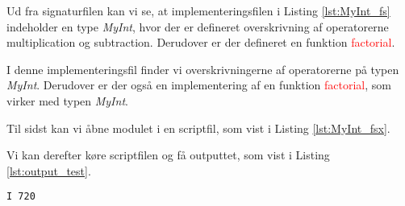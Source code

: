Ud fra signaturfilen kan vi se, at implementeringsfilen i Listing \ref{lst:MyInt_fs} indeholder en type \textit{MyInt}, hvor der er defineret overskrivning af operatorerne multiplication og subtraction. Derudover er der defineret en funktion \textcolor{red}{factorial}. 



I denne implementeringsfil finder vi overskrivningerne af operatorerne på typen \textit{MyInt}. Derudover er der også en implementering af en funktion \textcolor{red}{factorial}, som virker med typen \textit{MyInt}. 

Til sidst kan vi åbne modulet i en scriptfil, som vist i Listing \ref{lst:MyInt_fsx}.



Vi kan derefter køre scriptfilen og få outputtet, som vist i Listing \ref{lst:output_test}.

\begin{lstlisting}[style=output, label={lst:output_test}, caption={Output ved kørsel af \textit{MyInt.fsx}}]
I 720
\end{lstlisting}


